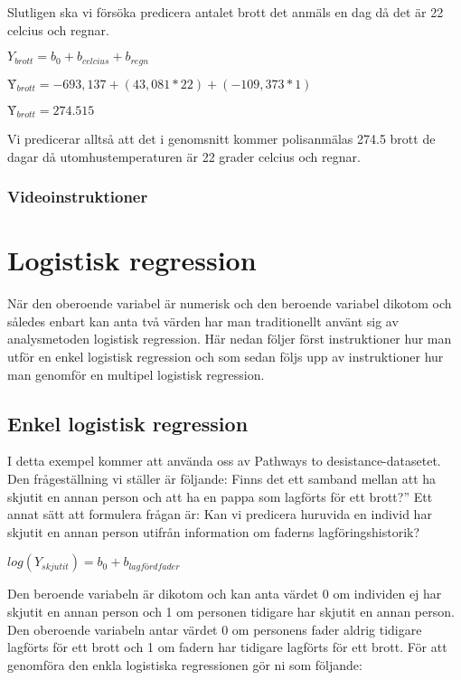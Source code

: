 \documentclass[
]{book}
\begin{document}
Slutligen ska vi försöka predicera antalet brott det anmäls en dag då det är 22 celcius och regnar.

\(Y_{brott} = b_0 + b_{celcius} + b_{regn}\)

\(Ŷ_{brott} = -693,137 + (43,081*22) + (-109,373*1)\)

\(Ŷ_{brott} = 274.515\)

Vi predicerar alltså att det i genomsnitt kommer polisanmälas 274.5 brott de dagar då utomhustemperaturen är 22 grader celcius och regnar.

\hypertarget{videoinstruktioner-11}{%
\subsection{Videoinstruktioner}\label{videoinstruktioner-11}}

\hypertarget{logistisk-regression}{%
\chapter{Logistisk regression}\label{logistisk-regression}}

När den oberoende variabel är numerisk och den beroende variabel dikotom och således enbart kan anta två värden har man traditionellt använt sig av analysmetoden logistisk regression.
Här nedan följer först instruktioner hur man utför en enkel logistisk regression och som sedan följs upp av instruktioner hur man genomför en multipel logistisk regression.

\hypertarget{enkel-logistisk-regression}{%
\section{Enkel logistisk regression}\label{enkel-logistisk-regression}}

I detta exempel kommer att använda oss av Pathways to desistance-datasetet. Den frågeställning vi ställer är följande: Finns det ett samband mellan att ha skjutit en annan person och att ha en pappa som lagförts för ett brott?'' Ett annat sätt att formulera frågan är: Kan vi predicera huruvida en individ har skjutit en annan person utifrån information om faderns lagföringshistorik?

\(log(Y_{skjutit}) = b_0 + b_{lagfördfader}\)

Den beroende variabeln är dikotom och kan anta värdet 0 om individen ej har skjutit en annan person och 1 om personen tidigare har skjutit en annan person. Den oberoende variabeln antar värdet 0 om personens fader aldrig tidigare lagförts för ett brott och 1 om fadern har tidigare lagförts för ett brott. För att genomföra den enkla logistiska regressionen gör ni som följande:
\end{document}
